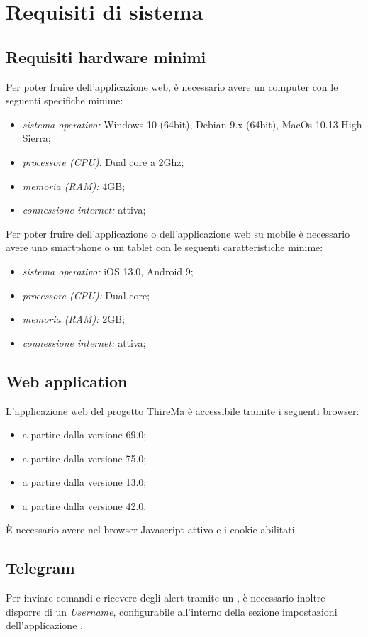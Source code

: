 \section{Requisiti di sistema}

	\subsection{Requisiti hardware minimi}
	Per poter fruire dell'applicazione web, è necessario avere un computer con le seguenti specifiche minime:
	\begin{itemize}
	 	\item \textit{sistema operativo:} Windows 10 (64bit), Debian 9.x (64bit), MacOs 10.13 High Sierra;
	 	\item \textit{processore (CPU):} Dual core a 2Ghz;
	 	\item \textit{memoria (RAM):} 4GB;
	 	\item \textit{connessione internet:} attiva; 
	\end{itemize} 
	Per poter fruire dell'applicazione  o dell'applicazione web su mobile è necessario avere uno smartphone o un tablet con le seguenti caratteristiche minime:
	\begin{itemize}
	 	\item \textit{sistema operativo:} iOS 13.0, Android 9;
	 	\item \textit{processore (CPU):} Dual core;
	 	\item \textit{memoria (RAM):} 2GB;
	 	\item \textit{connessione internet:} attiva; 
	\end{itemize} 

	\subsection{Web application}
	L'applicazione web del progetto ThireMa è accessibile tramite i seguenti browser:
	\begin{itemize}
	 	\item {} a partire dalla versione 69.0;
	 	\item {} a partire dalla versione 75.0;
	 	\item {} a partire dalla versione 13.0;
	 	\item {} a partire dalla versione 42.0.
	\end{itemize} 
	È necessario avere nel browser Javascript attivo e i cookie abilitati.

	\subsection{Telegram}
	Per inviare comandi e ricevere degli alert tramite un , è necessario inoltre disporre di un \textit{Username}, configurabile all'interno della sezione impostazioni dell'applicazione .
